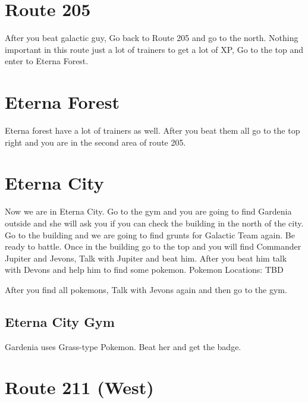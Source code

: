 \documentclass[11pt]{article}
\begin{document}
\section{Route 205}\label{sec:Route_205}
After you beat galactic guy, Go back to Route 205 and go to the north.
Nothing important in this route just a lot of trainers to get a lot of XP,
Go to the top and enter to Eterna Forest.





\section{Eterna Forest}\label{sec:Eterna_Forest}
Eterna forest have a lot of trainers as well.
After you beat them all go to the top right and you are in the second area of route 205.





\section{Eterna City}\label{sec:eterna-city}
Now we are in Eterna City.
Go to the gym and you are going to find Gardenia outside and she will ask you
if you can check the building in the north of the city.
Go to the building and we are going to find grunts for Galactic Team again.
Be ready to battle.
Once in the building go to the top and you will find
Commander Jupiter and Jevons, Talk with Jupiter and beat him.
After you beat him talk with Devons and help him to find some pokemon.
Pokemon Locations: TBD

After you find all pokemons, Talk with Jevons again and then go to the gym.

\subsection{Eterna City Gym}\label{subsec:eterna-city-gym}
Gardenia uses Grass-type Pokemon.
Beat her and get the badge.

\section{Route 211 (West)}\label{sec:Route_211_(West)}
\end{document}
